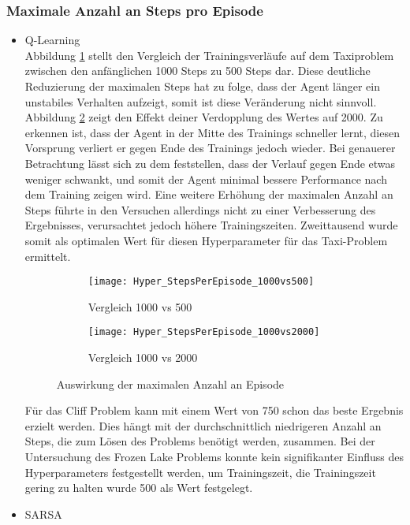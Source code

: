 \subsubsection{Maximale Anzahl an Steps pro Episode}
\begin{itemize}
    \item Q-Learning\\
    Abbildung \ref{fig:MaxStepCount_1000vs500} stellt den Vergleich der Trainingsverläufe auf dem Taxiproblem zwischen den anfänglichen 1000 Steps zu 500 Steps dar.
    Diese deutliche Reduzierung der maximalen Steps hat zu folge, dass der Agent länger ein unstabiles Verhalten aufzeigt, somit ist diese Veränderung nicht sinnvoll.
    Abbildung \ref{fig:MaxStepCount_1000vs2000} zeigt den Effekt deiner Verdopplung des Wertes auf 2000. Zu erkennen ist, dass der Agent in der Mitte des Trainings schneller lernt, diesen Vorsprung verliert er gegen Ende des Trainings jedoch wieder.
    Bei genauerer Betrachtung lässt sich zu dem feststellen, dass der Verlauf gegen Ende etwas weniger schwankt, und somit der Agent minimal bessere Performance nach dem Training zeigen wird. 
    Eine weitere Erhöhung der maximalen Anzahl an Steps führte in den Versuchen allerdings nicht zu einer Verbesserung des Ergebnisses, verursachtet jedoch höhere Trainingszeiten.
    Zweittausend wurde somit als optimalen Wert für diesen Hyperparameter für das Taxi-Problem ermittelt. 

    \begin{figure}[H]
        \centering
        \begin{subfigure}{.5\textwidth}
          \centering
          \texttt{[image: Hyper\_StepsPerEpisode\_1000vs500]}
          \caption{Vergleich 1000 vs 500}
          \label{fig:MaxStepCount_1000vs500}
        \end{subfigure}%
        \begin{subfigure}{.5\textwidth}
          \centering
          \texttt{[image: Hyper\_StepsPerEpisode\_1000vs2000]}
          \caption{Vergleich 1000 vs 2000}
          \label{fig:MaxStepCount_1000vs2000}
        \end{subfigure}
        \caption{Auswirkung der maximalen Anzahl an Episode}
        \label{fig:MaxStepCount}
    \end{figure}

    Für das Cliff Problem kann mit einem Wert von 750 schon das beste Ergebnis erzielt werden. 
    Dies hängt mit der durchschnittlich niedrigeren Anzahl an Steps, die zum Lösen des Problems benötigt werden, zusammen. 
    Bei der Untersuchung des Frozen Lake Problems konnte kein signifikanter Einfluss des Hyperparameters festgestellt werden, um Trainingszeit, die Trainingszeit gering zu halten wurde 500 als Wert festgelegt.
    \item SARSA\\
    


\end{itemize}
